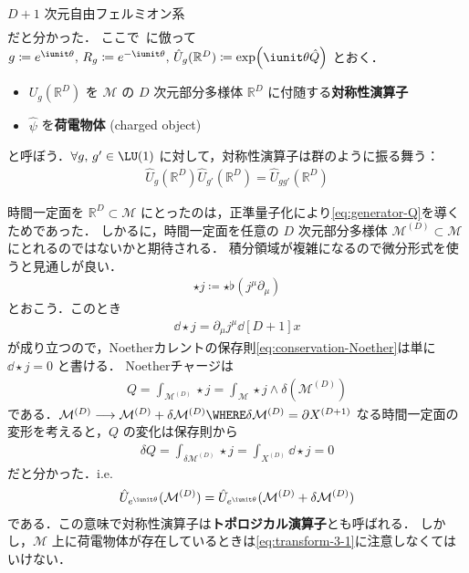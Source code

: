 \documentclass[TQFT_main]{subfiles}
\begin{document}
\begin{myexample}[label=ex:3-1]{$D+1$ 次元自由フェルミオン系}
\begin{align}
    \end{align}
    だと分かった．
    ここで~\cite[p.6]{GaiottoKapustinSeibergWillett2015}に倣って $g \coloneqq e^{\iunit \theta},\, R_g \coloneqq e^{-\iunit\theta},\, \hat{U}_g (\mathbb{R}^D) \coloneqq \exp (\iunit \theta \hat{Q})$ とおく．
    \begin{itemize}
        \item $U_g (\mathbb{R}^D)$ を $\mathcal{M}$ の $D$ 次元部分多様体 $\mathbb{R}^D$ に付随する\textbf{対称性演算子}
        \item $\hat{\psi}$ を\textbf{荷電物体} (charged object)
    \end{itemize}
    と呼ぼう．$\forall g,\, g' \in \LU(1)$ に対して，対称性演算子は群のように振る舞う：
    \begin{align}
        \hat{U}_g (\mathbb{R}^D) \hat{U}_{g'} (\mathbb{R}^D) = \hat{U}_{gg'} (\mathbb{R}^D)
    \end{align}
\end{myexample}


時間一定面を $\mathbb{R}^D \subset \mathcal{M}$ にとったのは，正準量子化により\eqref{eq:generator-Q}を導くためであった．
しかるに，時間一定面を任意の $D$ 次元部分多様体 $\mathcal{M}^{(D)} \subset \mathcal{M}$ にとれるのではないかと期待される．
積分領域が複雑になるので微分形式を使うと見通しが良い．
\begin{align}
    \star j \coloneqq \star \flat (j^\mu \partial_\mu)
\end{align}
とおこう．このとき
\begin{align}
    \label{eq:conservation-Noether-df}
    \dd \star j = \partial_\mu j^\mu \dd[D+1]{x}
\end{align}
が成り立つので，Noetherカレントの保存則\eqref{eq:conservation-Noether}は単に $\dd \star j = 0$ と書ける．
Noetherチャージは
\begin{align}
    \label{eq:Noether-charge-df}
    Q = \int_{\mathcal{M}^{(D)}} \star j = \int_{\mathcal{M}}  \star j \wedge \delta(\mathcal{M}^{(D)})
\end{align}
である．$\mathcal{M}^{(D)} \lto \mathcal{M}^{(D)} + \delta \mathcal{M}^{(D)} \WHERE \delta \mathcal{M}^{(D)} = \partial X^{(D+1)}$ なる時間一定面の変形を考えると，$Q$ の変化は保存則から
\begin{align}
    \delta Q = \int_{\delta \mathcal{M}^{(D)}} \star j = \int_{X^{(D)}} \dd \star j = 0
\end{align}
だと分かった．i.e.
\begin{align}
    \hat{U}_{e^{\iunit \theta}} (\mathcal{M}^{(D)}) = \hat{U}_{e^{\iunit \theta}} (\mathcal{M}^{(D)} + \delta \mathcal{M}^{(D)})
\end{align}
である．この意味で対称性演算子は\textbf{トポロジカル演算子}とも呼ばれる．
しかし，$\mathcal{M}$ 上に荷電物体が存在しているときは\eqref{eq:transform-3-1}に注意しなくてはいけない．
\end{document}
